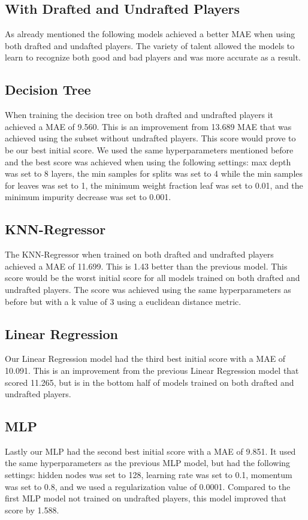 \documentclass{article}
\begin{document}
\subsection{With Drafted and Undrafted Players}
As already mentioned the following models achieved a better MAE when using both drafted and undafted players. 
The variety of talent allowed the models to learn to recognize both good and bad players and was more accurate as a result.
\subsection{Decision Tree}
When training the decision tree on both drafted and undrafted players it achieved a MAE of 9.560. 
This is an improvement from 13.689 MAE that was achieved using the subset without undrafted players.
This score would prove to be our best initial score. We used the same hyperparameters mentioned before and the
best score was achieved when using the following settings: max depth was set to 8 layers, 
the min samples for splits was set to 4 while the min samples for leaves was set to 1, the minimum weight fraction leaf 
was set to 0.01, and the minimum impurity decrease was set to 0.001.
\subsection{KNN-Regressor}
The KNN-Regressor when trained on both drafted and undrafted players achieved a MAE of 11.699. This is 1.43 better than 
the previous model. This score would be the worst initial score for all models trained on both drafted and undrafted players.
The score was achieved using the same hyperparameters as before but with a k value of 3 using a euclidean distance metric.
\subsection{Linear Regression}
Our Linear Regression model had the third best initial score with a MAE of 10.091. This is an improvement from the previous 
Linear Regression model that scored 11.265, but is in the bottom half of models trained on both drafted and undrafted players.
\subsection{MLP}
Lastly our MLP had the second best initial score with a MAE of 9.851. It used the same hyperparameters as the previous MLP model, 
but had the following settings: hidden nodes was set to 128, learning rate was set to 0.1, momentum was set to 0.8, and we used a 
regularization value of 0.0001. Compared to the first MLP model not trained on undrafted players, this model improved that score by 1.588.
\end{document}

